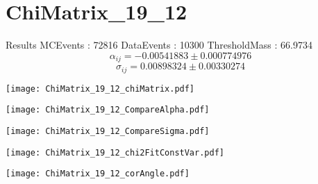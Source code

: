 \documentclass[a4paper,12pt]{article}
\begin{document}
\section{ChiMatrix\_19\_12}
\begin{minipage}{0.49\linewidth} Results \newline
MCEvents : 72816\newline
DataEvents : 10300 \newline
ThresholdMass : 66.9734\\
$$\alpha_{ij} = -0.00541883\pm 0.000774976$$
$$\sigma_{ij} = 0.00898324\pm 0.00330274$$
\end{minipage}\hfill
\begin{minipage}{0.49\linewidth} 
\texttt{[image: ChiMatrix\_19\_12\_chiMatrix.pdf]}\\
\end{minipage}
\hfill
\begin{minipage}{0.49\linewidth} 
\texttt{[image: ChiMatrix\_19\_12\_CompareAlpha.pdf]}\\
\end{minipage}
\hfill
\begin{minipage}{0.49\linewidth} 
\texttt{[image: ChiMatrix\_19\_12\_CompareSigma.pdf]}\\
\end{minipage}
\begin{minipage}{0.49\linewidth} 
\texttt{[image: ChiMatrix\_19\_12\_chi2FitConstVar.pdf]}\\
\end{minipage}
\hfill
\begin{minipage}{0.49\linewidth} 
\texttt{[image: ChiMatrix\_19\_12\_corAngle.pdf]}\\
\end{minipage}
\end{document}

